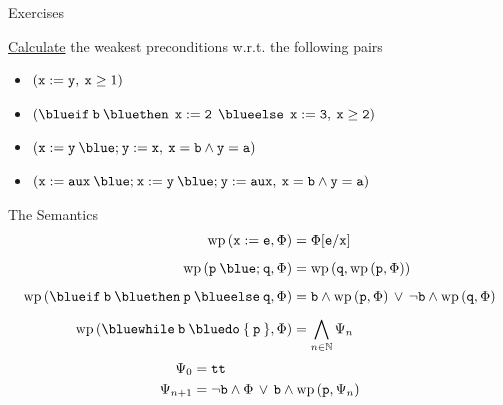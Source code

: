 \documentclass{beamer}
\begin{document}
\begin{frame}{Exercises}
        
        \alert{\underline{Calculate}} the weakest preconditions w.r.t. the following pairs
        \\[7pt]
        \begin{itemize}
                \item $(\mathtt{x := y}, \>  \mathtt{x} \geq 1)$
                        \\[7pt]
                \item $(\prog{{\blue if} \>  b \> {\blue then} \> \> 
                        x:=2 \> \> {\blue else} \> \> x:= 3}, \> \prog{x \geq 2})$
                        \\[7pt]
                \item $(\prog{x:= y \> {\blue ;} \> y := x}, \> \prog{ x = b \wedge y = a })$
                        \\[7pt]
                \item $(\prog{x:= aux \> {\blue ;} \> 
                        x:= y \> {\blue ;} \> y := aux}, \> \prog{ x = b \wedge y = a })$
        \end{itemize}
\end{frame}

\begin{frame}{The Semantics}
        \begin{align*}
                \mathrm{wp}\,(\prog{x : = e}, \Phi) & = \Phi[\prog{e}/\prog{x}] \\[5pt]
                \mathrm{wp}\,(\prog{p} \> {\blue ;} \> \prog{q}, \Phi) & 
                = \mathrm{wp} \, (\prog{q}, \mathrm{wp} \, (\prog{p}, \Phi))  \\[5pt]
                \mathrm{wp}\,({\mathtt{{\blue if} \> b \> {\blue then} \> p \> {\blue else} \> q}}, \Phi)
                & 
                =
                \prog{b} \wedge \mathrm{wp}\, (\prog{p},\Phi) \, \vee \,
                \prog{\neg b} \wedge \mathrm{wp} \, (\prog{q}, \Phi)
                \\[5pt]
                \mathrm{wp} \, ({\mathtt{{\blue while} \> b \> {\blue do} \> \{ \> p \> \}} }, \Phi)
                & = \bigwedge_{n \in \Nats} \Psi_n
        \end{align*}
        \pause
        \vspace{-0.5cm}
        \begin{align*}
                \Psi_0 & = \mathtt{tt} \\
                \Psi_{n+1} & = \neg \mathtt{b} \wedge \Phi \, \vee \, \mathtt{b} \wedge 
                \mathrm{wp} \, (\mathtt{p}, \Psi_n)
        \end{align*}
\end{frame}
\end{document}
